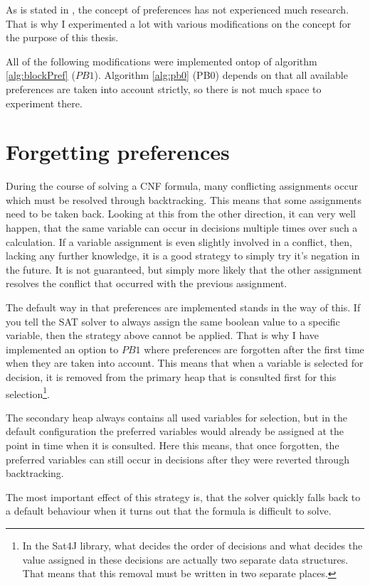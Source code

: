 As is stated in \cite{PJ18}, the concept of preferences has not experienced much research. That is why I experimented a lot with various modifications on the concept for the purpose of this thesis.

All of the following modifications were implemented ontop of algorithm \ref{alg:blockPref} ($PB1$). Algorithm \ref{alg:pb0} (PB0) depends on that all available preferences are taken into account strictly, so there is not much space to experiment there. 


\section{Forgetting preferences}
During the course of solving a CNF formula, many conflicting assignments occur which must be resolved through backtracking. This means that some assignments need to be taken back. Looking at this from the other direction, it can very well happen, that the same variable can occur in decisions multiple times over such a calculation. If a variable assignment is even slightly involved in a conflict, then, lacking any further knowledge, it is a good strategy to simply try it's negation in the future. It is not guaranteed, but simply more likely that the other assignment resolves the conflict that occurred with the previous assignment.

The default way in that preferences are implemented stands in the way of this. If you tell the SAT solver to always assign the same boolean value to a specific variable, then the strategy above cannot be applied. That is why I have implemented an option to $PB1$ where preferences are forgotten after the first time when they are taken into account. This means that when a variable is selected for decision, it is removed from the primary heap that is consulted first for this selection\footnote{
	In the Sat4J library, what decides the order of decisions and what decides the value assigned in these decisions are actually two separate data structures. That means that this removal must be written in two separate places.
}. 

The secondary heap always contains all used variables for selection, but in the default configuration the preferred variables would already be assigned at the point in time when it is consulted. Here this means, that once forgotten, the preferred variables can still occur in decisions after they were reverted through backtracking. 

The most important effect of this strategy is, that the solver quickly falls back to a default behaviour when it turns out that the formula is difficult to solve.

